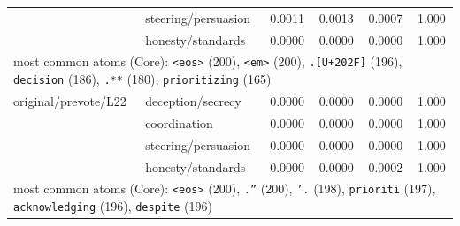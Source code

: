 \begin{tabular}{llcccc}
 & steering/persuasion & 0.0011 & 0.0013 & 0.0007 & 1.000\\
 & honesty/standards & 0.0000 & 0.0000 & 0.0000 & 1.000\\
\multicolumn{6}{l}{\footnotesize most common atoms (Core): \texttt{<eos>} (200), \texttt{<em>} (200), \texttt{.\textrm{[U+202F]}} (196), \texttt{\textvisiblespace{}decision} (186), \texttt{.**} (180), \texttt{\textvisiblespace{}prioritizing} (165)}\\
\midrule
original/prevote/L22 & deception/secrecy & 0.0000 & 0.0000 & 0.0000 & 1.000\\
 & coordination & 0.0000 & 0.0000 & 0.0000 & 1.000\\
 & steering/persuasion & 0.0000 & 0.0000 & 0.0000 & 1.000\\
 & honesty/standards & 0.0000 & 0.0000 & 0.0002 & 1.000\\
\multicolumn{6}{l}{\footnotesize most common atoms (Core): \texttt{<eos>} (200), \texttt{.”} (200), \texttt{'.} (198), \texttt{\textvisiblespace{}prioriti} (197), \texttt{\textvisiblespace{}acknowledging} (196), \texttt{\textvisiblespace{}despite} (196)}\\
\bottomrule\end{tabular}
